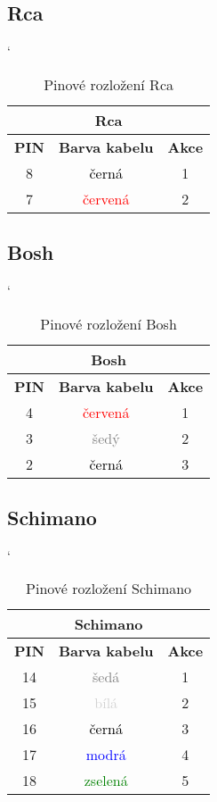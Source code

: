 \subsection{Rca}

\begin{table} [H]
	\centering
	\catcode`
	\begin{tabular}[c]{|| c | c | c ||}
	\hline
		\multicolumn{3}{||c||}{Rca} \\
	\hline
 		 \textbf{PIN} &  \textbf{Barva kabelu} & \textbf{Akce}\\
	\hline
		8 & \textcolor{black}{černá} & 1\\
	\hline
		7 & \textcolor{red}{červená} & 2 \\
	\hline
	\end{tabular}
	\caption{Pinové rozložení Rca}
	\label{table:pinRca}
\end{table}

\subsection{Bosh}

\begin{table} [h!]
	\centering
	\catcode`
	\begin{tabular}[c]{|| c | c | c ||}
	\hline
		\multicolumn{3}{||c||}{Bosh} \\
	\hline
 		 \textbf{PIN} &  \textbf{Barva kabelu} & \textbf{Akce}\\
	\hline
		4 & \textcolor{red}{červená} & 1\\
	\hline
		3 & \textcolor{gray}{šedý} & 2 \\
	\hline
		2 & \textcolor{black}{černá} & 3 \\
	\hline
	\end{tabular}
	\caption{Pinové rozložení Bosh}
	\label{table:pinBosh}
\end{table}

\subsection{Schimano}

\begin{table} [h!]
	\centering
	\catcode`
	\begin{tabular}[c]{|| c | c | c ||}
	\hline
		\multicolumn{3}{||c||}{Schimano} \\
	\hline
 		 \textbf{PIN} &  \textbf{Barva kabelu} & \textbf{Akce}\\
	\hline
		14 & \textcolor{gray}{šedá} & 1\\
	\hline
		15 & \textcolor{lightgray}{bílá} & 2 \\
	\hline
		16 & \textcolor{black}{černá} & 3 \\
	\hline
		17 & \textcolor{blue}{modrá} & 4 \\
	\hline
		18 & \textcolor{green}{zselená} & 5 \\
	\hline
	\end{tabular}
	\caption{Pinové rozložení Schimano}
	\label{table:pinSchimano}
\end{table}
